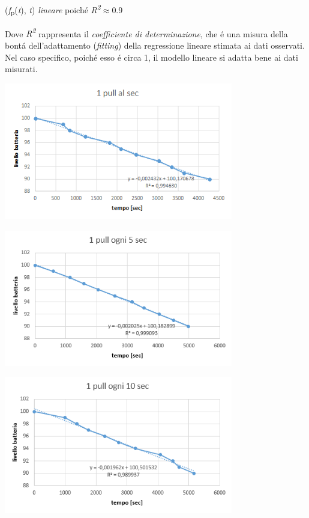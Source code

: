 \documentclass{article}
\begin{document}
\begin{center}
(\textit{f}\textsubscript{p}(\textit{t}), \textit{t})  \textit{lineare} poich\'e \textit{R\textsuperscript{2}}\(\approx\)0.9
\end{center}

Dove \textit{R\textsuperscript{2}} rappresenta il \textit{coefficiente di determinazione}, che \'e una misura della bont\'a dell'adattamento (\textit{fitting}) della regressione lineare stimata ai dati osservati. Nel caso specifico, poich\'e esso \'e circa 1, il modello lineare si adatta bene ai dati misurati.

\begin{center}
\includegraphics[width=0.75\textwidth]{1alsec.jpg} %
\label{fig:1 pull ogni secondo}
\end{center}

\begin{center}
\includegraphics[width=0.75\textwidth]{5alsec.jpg} %
\label{fig:1 pull ogni 5 secondi}
\end{center}

\begin{center}
\includegraphics[width=0.75\textwidth]{10alsec.jpg} %
\label{fig:1 pull ogni 10 secondi}
\end{center}
\end{document}
